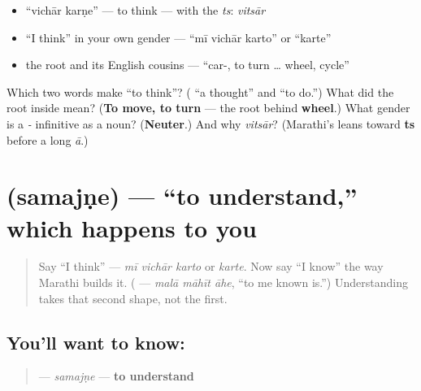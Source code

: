 \begin{itemize}
\raggedright
  \item \textquotedblleft{}vichār karṇe\textquotedblright{} — to think — with the \emph{ts}: \emph{vitsār}
  \item \textquotedblleft{}I think\textquotedblright{} in your own gender — \textquotedblleft{}mī vichār karto\textquotedblright{} or \textquotedblleft{}karte\textquotedblright{}
  \item the root and its English cousins — \textquotedblleft{}car-, to turn … wheel, cycle\textquotedblright{}
\end{itemize}

\begin{tcolorbox}[breakable,colback=teal!4,colframe=teal!35!black,title={Before you move on}]
Which two words make \textquotedblleft{}to think\textquotedblright{}? (\textbf{} \textquotedblleft{}a thought\textquotedblright{} and \textbf{} \textquotedblleft{}to do.\textquotedblright{}) What did the root inside \textbf{} mean? (\textbf{To move, to turn} — the root behind \textbf{wheel}.) What gender is a \emph{-} infinitive as a noun? (\textbf{Neuter}.) And why \emph{vitsār}? (Marathi's \textbf{} leans toward \textbf{ts} before a long \emph{ā}.)
\end{tcolorbox}
\section[\texorpdfstring{\mr{समजणे} (samajṇe)}{समजणे (samajṇe)}]{ (samajṇe) — \textquotedblleft{}to understand,\textquotedblright{} which happens to you}

\label{lesson:MR-C08-samajne}



\begin{quote}
Say \textquotedblleft{}I think\textquotedblright{} — \emph{mī vichār karto} or \emph{karte}. Now say \textquotedblleft{}I know\textquotedblright{} the way Marathi builds it. (\textbf{  } — \emph{malā māhīt āhe}, \textquotedblleft{}to me known is.\textquotedblright{}) Understanding takes that second shape, not the first.
\end{quote}

\subsection*{You'll want to know: }
\begin{quote}
\textbf{} — \emph{samajṇe} — \textbf{to understand}
\end{quote}

